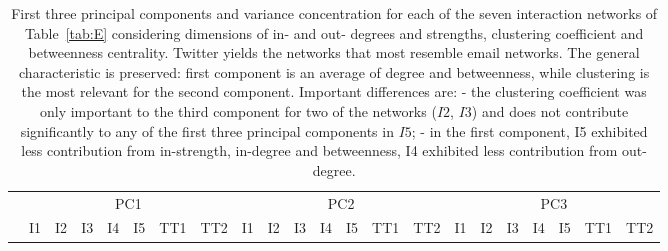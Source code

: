 \documentclass[%
 aip,
 jmp,%
 amsmath,amssymb,
 reprint,%
 floatfix,
]{revtex4-1}
\begin{document}
\begin{table}[!h]
	\caption{First three principal components and variance concentration for each of the seven interaction networks of Table~\ref{tab:E} considering dimensions of in- and out- degrees and strengths, clustering coefficient and betweenness centrality. Twitter yields the networks that most resemble email networks. The general characteristic is preserved: first component is an average of degree and betweenness, while clustering is the most relevant for the second component. Important differences are: - the clustering coefficient was only important to the third component for two of the networks ($I2$, $I3$) and does not contribute significantly to any of the first three principal components in $I5$; - in the first component, I5 exhibited less contribution from in-strength, in-degree and betweenness, I4 exhibited less contribution from out-degree.}
	\footnotesize
	\begin{center}
		\begin{tabular}{| l ||  c |c |c |c |c | c | c || c | c | c | c | c | c | c || c |c |c |c |c | c | c |	}\cline{2-22}
			\multicolumn{1}{c|}{} & \multicolumn{7}{c||}{PC1}          & \multicolumn{7}{c||}{PC2} & \multicolumn{7}{c|}{PC3}  \\\cline{2-22}
			\multicolumn{1}{c|}{} & 
			I1 & I2 & I3 & I4 & I5 & TT1 & TT2 &
			I1 & I2 & I3 & I4 & I5 & TT1 & TT2 &
			I1 & I2 & I3 & I4 & I5 & TT1 & TT2 \\\hline
			
			\hline
		\end{tabular}
	\end{center}
	\label{tab:pcaE2}
\end{table}
\end{document}
